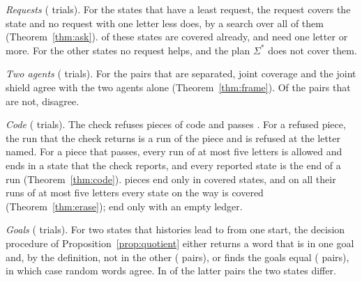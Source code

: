 \documentclass[acmsmall,nonacm,screen]{acmart}
\newcommand{\claim}[2]{#2}
\begin{document}
\emph{Requests} (\exTrialsAsk{} trials). \claim{ask-least}{For the \exRequests{} states that
have a least request, the request covers the state and no request with one letter less
does, by a search over all of them (Theorem~\ref{thm:ask}).} \exRequestsNone{} of these
states are covered already, and \exRequestsSome{} need one letter or more. For the other
\exNoRequest{} states no request helps, and the plan $\Sigma^{*}$ does not cover them.

\emph{Two agents} (\exTrialsFrame{} trials). \claim{frame-holds}{For the \exSeparated{}
pairs that are separated, joint coverage and the joint shield agree with the two agents
alone (Theorem~\ref{thm:frame}).} Of the \exNotSeparated{} pairs that are not, \exDiffer{}
disagree.

\emph{Code} (\exTrialsCode{} trials). The check refuses \exPiecesRefused{} pieces of code
and passes \exPiecesPassed{}. \claim{code-holds}{For a refused piece, the run that the check
returns is a run of the piece and is refused at the letter named. For a piece that passes,
every run of at most five letters is allowed and ends in a state that the check reports,
and every reported state is the end of a run (Theorem~\ref{thm:code}).} \exPiecesSafe{}
pieces end only in covered states, and on all their runs of at most five letters every state
on the way is covered (Theorem~\ref{thm:erase}); \exPiecesClosed{} end only with an empty ledger.

\emph{Goals} (\exTrialsEqual{} trials). For two states that histories lead to from one
start, the decision procedure of Proposition~\ref{prop:quotient} either returns a word that
is in one goal and, by the definition, not in the other (\exToldApart{} pairs), or finds the
goals equal (\exSameGoal{} pairs), in which case random words agree. In \exSameGoalOther{} of
the latter pairs the two states differ.
\end{document}
